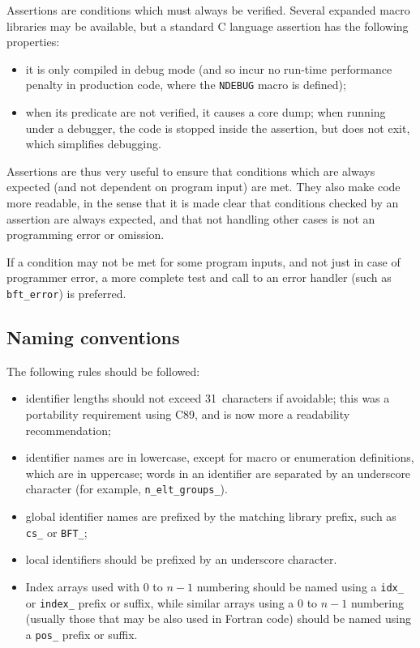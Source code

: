 Assertions are conditions which must always be verified. Several
expanded macro libraries may be available, but a standard C language
assertion has the following properties:

\begin{itemize}

\item it is only compiled in debug mode (and so incur no run-time
  performance penalty in production code, where the \texttt{NDEBUG}
  macro is defined);

\item when its predicate are not verified, it causes a core dump;
  when running under a debugger, the code is stopped inside the
  assertion, but does not exit, which simplifies debugging.

\end{itemize}

Assertions are thus very useful to ensure that conditions
which are always expected (and not dependent on program input)
are met. They also make code more readable, in the sense that
it is made clear that conditions checked by an assertion
are always expected, and that not handling other cases is not an
programming error or omission.

If a condition may not be met for some program inputs,
and not just in case of programmer error, a more complete
test and call to an error handler (such as \texttt{bft\_error})
is preferred.

\subsection{Naming conventions}

The following rules should be followed:

\begin{itemize}

\item identifier lengths should not exceed 31~characters if avoidable;
  this was a portability requirement using C89, and is now more a
  readability recommendation;

\item identifier names are in lowercase, except for macro or enumeration
  definitions, which are in uppercase; words in an identifier are
  separated by an underscore character (for example,
  \verb=n_elt_groups_=).

\item global identifier names are prefixed by the matching library prefix,
  such as \verb=cs_= or \verb=BFT_=;

\item local identifiers should be prefixed by an underscore character.

\item Index arrays used with $0$ to $n-1$ numbering should be named
  using a \verb=idx_= or \verb=index_= prefix or suffix, while
  similar arrays using a $0$ to $n-1$ numbering (usually those that may be
  also used in Fortran code) should be named using a \verb=pos_= 
  prefix or suffix.

\end{itemize}

